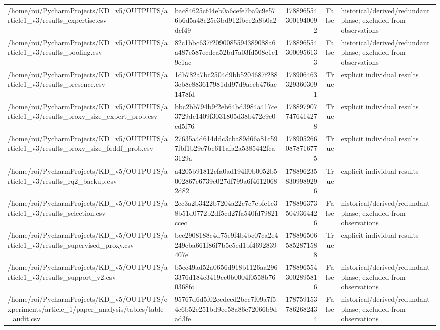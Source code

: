 \begin{tabular}{llrrl}
/home/roi/PycharmProjects/KD\_v5/OUTPUTS/article1\_v3/results\_expertise.csv & bac84625cf44eb0a6cefe7ba9c9e576b6d5a48c25e3bd912fbce2a8b0a2dcf49 & 1788965543001940092 & False & historical/derived/redundant phase; excluded from observations \\
/home/roi/PycharmProjects/KD\_v5/OUTPUTS/article1\_v3/results\_pooling.csv & 82c1bbc637f2090085594389088a6a487e587ecdca52bd7a03fd508c1c19c1ac & 1788965543000956133 & False & historical/derived/redundant phase; excluded from observations \\
/home/roi/PycharmProjects/KD\_v5/OUTPUTS/article1\_v3/results\_presence.csv & 1db782a7bc2504d9bb5204687f2883eb8c883617981dd97d9aeeb476ac1478fd & 1789064633293603091 & True & explicit individual results \\
/home/roi/PycharmProjects/KD\_v5/OUTPUTS/article1\_v3/results\_proxy\_size\_expert\_prob.csv & bbc2bb794b9f2eb64bd3984a417ce3729dc1409f3031805d38b472e9e0cd5f76 & 1788979077476414278 & True & explicit individual results \\
/home/roi/PycharmProjects/KD\_v5/OUTPUTS/article1\_v3/results\_proxy\_size\_feddf\_prob.csv & 27635a4d614ddc3cba89d66a81c597fbf1b29e7be611afa2a5385442fca3129a & 1789052660878716775 & True & explicit individual results \\
/home/roi/PycharmProjects/KD\_v5/OUTPUTS/article1\_v3/results\_rq2\_backup.csv & a4205b91812cfa0ad194ff0b0052b5002867e6739e027df799a6f46120682d82 & 1788962358309989296 & True & explicit individual results \\
/home/roi/PycharmProjects/KD\_v5/OUTPUTS/article1\_v3/results\_selection.csv & 2ec3a2b3422b7204a22c7c7cbfe1e38b51d0772b2df5cd27fa540fd79821ccec & 1788963735049364426 & False & historical/derived/redundant phase; excluded from observations \\
/home/roi/PycharmProjects/KD\_v5/OUTPUTS/article1\_v3/results\_supervised\_proxy.csv & bee2908188c4d75e9f4b4bc07ca2e4249eba661f86f7b5e5ed1bf4692839407e & 1788965065852871588 & True & explicit individual results \\
/home/roi/PycharmProjects/KD\_v5/OUTPUTS/article1\_v3/results\_support\_v2.csv & b5ec49ad52a0656d918b1126aa2963376d184e3419cc0b0004f0558b760368fc & 1788965543002895816 & False & historical/derived/redundant phase; excluded from observations \\
/home/roi/PycharmProjects/KD\_v5/OUTPUTS/experiments/article\_1/paper\_analysis/tables/table\_audit.csv & 95767d6d5f02ecdced2bcc7f09a7f54c6b52e251bd9ce58a86e72066b9dad3fe & 1787591537862682434 & False & historical/derived/redundant phase; excluded from observations \\

\end{tabular}
